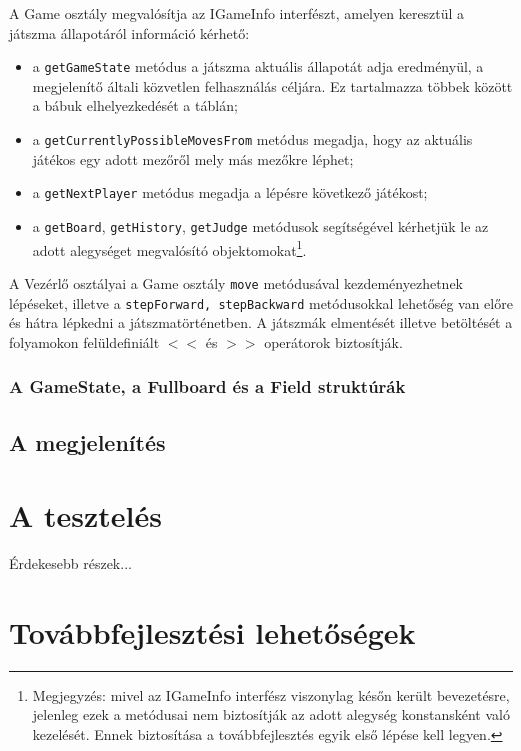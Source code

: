 \documentclass[12pt, twoside]{report}
\begin{document}
A Game osztály megvalósítja az IGameInfo interfészt, amelyen keresztül a játszma állapotáról információ kérhető:
\begin{itemize}
	\item a {\tt getGameState} metódus a játszma aktuális állapotát adja eredményül, a megjelenítő általi közvetlen felhasználás céljára. Ez tartalmazza többek között a bábuk elhelyezkedését a táblán;
	\item a {\tt getCurrentlyPossibleMovesFrom} metódus megadja, hogy az aktuális játékos egy adott mezőről mely más mezőkre léphet;
	\item a {\tt getNextPlayer} metódus megadja a lépésre következő játékost;
	\item a {\tt getBoard}, {\tt getHistory}, {\tt getJudge} metódusok segítségével kérhetjük le az adott alegységet megvalósító objektomokat\footnote{Megjegyzés: mivel az IGameInfo interfész viszonylag későn került bevezetésre, jelenleg ezek a metódusai nem biztosítják az adott alegység konstansként való kezelését. Ennek biztosítása a továbbfejlesztés egyik első lépése kell legyen.}.
\end{itemize}

A Vezérlő osztályai a Game osztály {\tt move} metódusával kezdeményezhetnek lépéseket, illetve a {\tt stepForward, stepBackward} metódusokkal lehetőség van előre és hátra lépkedni a játszmatörténetben. A játszmák elmentését illetve betöltését a folyamokon felüldefiniált $<<$ és $>>$ operátorok biztosítják.

\subsubsection{A GameState, a Fullboard és a Field struktúrák}

\subsection{A megjelenítés}

\section{A tesztelés}


Érdekesebb részek...

\section{Továbbfejlesztési lehetőségek}
\end{document}
